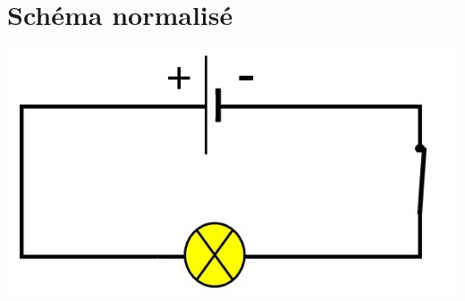 \documentclass[xcolor={dvipsnames}]{beamer}
\begin{document}
\section{Schéma normalisé}
\begin{frame}
	
	
	\begin{center}
		\includegraphics[scale=0.5]{../img/schema}
	\end{center}
\end{frame}



%
%
%	
%
%
%
%	
%	
%
%
%
%	
%			
%			
\end{document}
